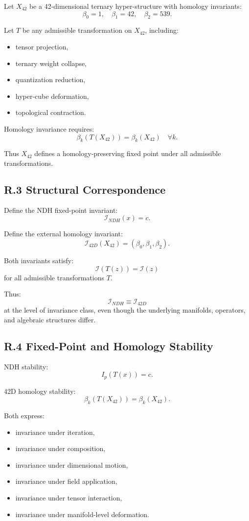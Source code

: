 Let $X_{42}$ be a 42-dimensional ternary hyper-structure with homology
invariants:
\[
\beta_0 = 1,\quad \beta_1 = 42,\quad \beta_2 = 539.
\]

Let $T$ be any admissible transformation on $X_{42}$, including:
\begin{itemize}
    \item tensor projection,
    \item ternary weight collapse,
    \item quantization reduction,
    \item hyper-cube deformation,
    \item topological contraction.
\end{itemize}

Homology invariance requires:
\[
\beta_k(T(X_{42})) = \beta_k(X_{42})
\quad\forall k.
\]

Thus $X_{42}$ defines a homology-preserving fixed point under all
admissible transformations.

\subsection*{R.3 Structural Correspondence}

Define the NDH fixed-point invariant:
\[
\mathcal{I}_{NDH}(x) = c.
\]

Define the external homology invariant:
\[
\mathcal{I}_{42D}(X_{42}) = (\beta_0, \beta_1, \beta_2).
\]

Both invariants satisfy:
\[
\mathcal{I}(T(z)) = \mathcal{I}(z)
\]
for all admissible transformations $T$.

Thus:
\[
\mathcal{I}_{NDH} \equiv \mathcal{I}_{42D}
\]
at the level of invariance class, even though the underlying manifolds,
operators, and algebraic structures differ.

\subsection*{R.4 Fixed-Point and Homology Stability}

NDH stability:
\[
I_p(T(x)) = c.
\]

42D homology stability:
\[
\beta_k(T(X_{42})) = \beta_k(X_{42}).
\]

Both express:
\begin{itemize}
    \item invariance under iteration,
    \item invariance under composition,
    \item invariance under dimensional motion,
    \item invariance under field application,
    \item invariance under tensor interaction,
    \item invariance under manifold-level deformation.
\end{itemize}

